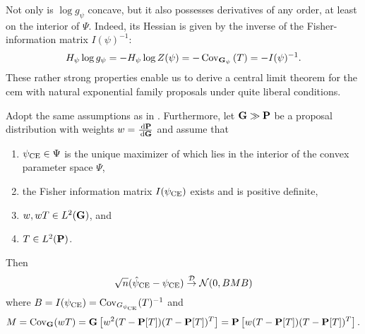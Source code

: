 Not only is $\log g_{\psi}$ concave, but it also possesses derivatives of any order, at least on the interior of $\Psi$. Indeed, its Hessian is given by the inverse of the Fisher-information matrix $I(\psi)^{-1}$:
$$
H_{\psi} \log g_{\psi} = - H_{\psi} \log Z (\psi) = - \cov_{\G_{\psi}} \left(T\right) = -I(\psi)^{-1}.
$$
These rather strong properties enable us to derive a central limit theorem for the \acrshort{cem} with natural exponential family proposals under quite liberal conditions.

\begin{theorem}
    \label{thm:cem-clt}
    Adopt the same assumptions as in . Furthermore, let $\G \gg \P$ be a proposal distribution with weights $w = \rnd{\P}{\G}$ and assume that
    \begin{enumerate}
        \item\label{it:pceinterior} $\pce \in \Psi$ is the unique maximizer of  which lies in the interior of the convex parameter space $\Psi$, 
        \item\label{it:FIMspd} the Fisher information matrix $I(\pce)$ exists and is positive definite,
        \item\label{it:wTinL2G} $w,wT \in L^{2}(\G)$, and 
        \item\label{it:TinL2P} $T\in L^{2}(\P)$.
    \end{enumerate}
    
    Then 
    $$
        \sqrt{n}(\hpce - \pce) \convD \Normal (0, BMB)
    $$
    where $B = I(\pce) = \cov_{G_{\pce}} (T)^{-1}$ and $$M = \cov_{\G} (wT) = \G \left[w^{2} (T - \P[T])(T - \P[T])^{T}\right] = \P \left[ w (T - \P [T]) (T - \P [T])^{T} \right].$$
\end{theorem}

